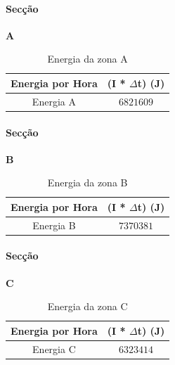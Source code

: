 \documentclass[12pt, a4paper]{article}
\begin{document}
\paragraph{Secção}
\textbf{A}

\begin{table}[htpb]
	\begin{center}
		\begin{tabular}{c c}
			\toprule
			Energia por Hora 								 & 	(I * $\Delta$t) (J)  \\
			\midrule
			Energia A 						               	     & $6821609$	 \\
			\bottomrule
		\end{tabular}
	\end{center}
	\caption{Energia da zona A}\label{tab:1seccaoApotT28}
\end{table}

\paragraph{Secção}
\textbf{B}

\begin{table}[htpb]
	\begin{center}
		\begin{tabular}{c c}
			\toprule
			Energia por Hora 								 & 	(I * $\Delta$t) (J)  \\
			\midrule
			Energia B						               	     & $7370381$	 \\
			\bottomrule
		\end{tabular}
	\end{center}
	\caption{Energia da zona B}\label{tab:1seccaoBpotT28}
\end{table}

\paragraph{Secção}
\textbf{C}

\begin{table}[htpb]
	\begin{center}
		\begin{tabular}{c c}
			\toprule
			Energia por Hora 								 & 	(I * $\Delta$t) (J)  \\
			\midrule
			Energia C 						               	     & $6323414$	 \\
			\bottomrule
		\end{tabular}
	\end{center}
	\caption{Energia da zona C}\label{tab:3seccaoCpotT28}
\end{table}
\end{document}
